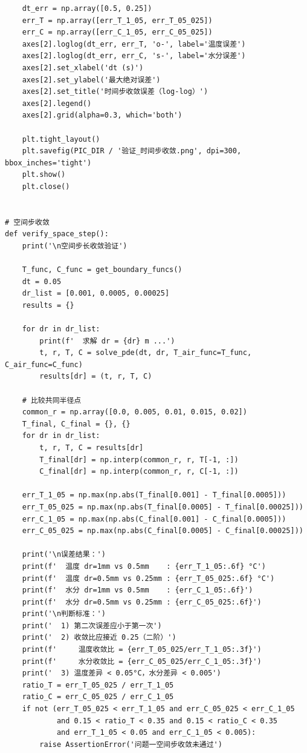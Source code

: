\documentclass[withoutpreface,bwprint]{cumcm_thesis}
\begin{document}
\begin{appendices}
\begin{lstlisting}
    dt_err = np.array([0.5, 0.25])
    err_T = np.array([err_T_1_05, err_T_05_025])
    err_C = np.array([err_C_1_05, err_C_05_025])
    axes[2].loglog(dt_err, err_T, 'o-', label='温度误差')
    axes[2].loglog(dt_err, err_C, 's-', label='水分误差')
    axes[2].set_xlabel('dt (s)')
    axes[2].set_ylabel('最大绝对误差')
    axes[2].set_title('时间步收敛误差（log-log）')
    axes[2].legend()
    axes[2].grid(alpha=0.3, which='both')

    plt.tight_layout()
    plt.savefig(PIC_DIR / '验证_时间步收敛.png', dpi=300, bbox_inches='tight')
    plt.show()
    plt.close()


# 空间步收敛
def verify_space_step():
    print('\n空间步长收敛验证')

    T_func, C_func = get_boundary_funcs()
    dt = 0.05
    dr_list = [0.001, 0.0005, 0.00025]
    results = {}

    for dr in dr_list:
        print(f'  求解 dr = {dr} m ...')
        t, r, T, C = solve_pde(dt, dr, T_air_func=T_func, C_air_func=C_func)
        results[dr] = (t, r, T, C)

    # 比较共同半径点
    common_r = np.array([0.0, 0.005, 0.01, 0.015, 0.02])
    T_final, C_final = {}, {}
    for dr in dr_list:
        t, r, T, C = results[dr]
        T_final[dr] = np.interp(common_r, r, T[-1, :])
        C_final[dr] = np.interp(common_r, r, C[-1, :])

    err_T_1_05 = np.max(np.abs(T_final[0.001] - T_final[0.0005]))
    err_T_05_025 = np.max(np.abs(T_final[0.0005] - T_final[0.00025]))
    err_C_1_05 = np.max(np.abs(C_final[0.001] - C_final[0.0005]))
    err_C_05_025 = np.max(np.abs(C_final[0.0005] - C_final[0.00025]))

    print('\n误差结果：')
    print(f'  温度 dr=1mm vs 0.5mm    : {err_T_1_05:.6f} °C')
    print(f'  温度 dr=0.5mm vs 0.25mm : {err_T_05_025:.6f} °C')
    print(f'  水分 dr=1mm vs 0.5mm    : {err_C_1_05:.6f}')
    print(f'  水分 dr=0.5mm vs 0.25mm : {err_C_05_025:.6f}')
    print('\n判断标准：')
    print('  1) 第二次误差应小于第一次')
    print('  2) 收敛比应接近 0.25（二阶）')
    print(f'     温度收敛比 = {err_T_05_025/err_T_1_05:.3f}')
    print(f'     水分收敛比 = {err_C_05_025/err_C_1_05:.3f}')
    print('  3) 温度差异 < 0.05°C，水分差异 < 0.005')
    ratio_T = err_T_05_025 / err_T_1_05
    ratio_C = err_C_05_025 / err_C_1_05
    if not (err_T_05_025 < err_T_1_05 and err_C_05_025 < err_C_1_05
            and 0.15 < ratio_T < 0.35 and 0.15 < ratio_C < 0.35
            and err_T_1_05 < 0.05 and err_C_1_05 < 0.005):
        raise AssertionError('问题一空间步收敛未通过')


\end{lstlisting}
\end{appendices}
\end{document}
